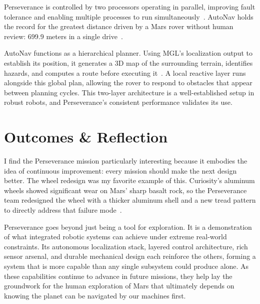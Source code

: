 \documentclass[11pt]{article}
\begin{document}
Perseverance is controlled by two processors operating in parallel, improving
fault tolerance and enabling multiple processes to run simultaneously~\cite{rover_components}. AutoNav holds the record
for the greatest distance driven by a Mars rover without human review: 699.9 meters in a single
drive~\cite{autonav_jpl,science_robotics}.

AutoNav functions as a hierarchical planner. Using MGL's localization output to establish its
position, it generates a 3D map of the surrounding terrain, identifies hazards, and computes a
route before executing it~\cite{autonav_jpl}. A local reactive layer runs alongside this global plan, allowing
the rover to respond to obstacles that appear between planning cycles. This two-layer architecture
is a well-established setup in robust robots, and Perseverance's consistent performance validates its use.

\section*{Outcomes \& Reflection}
I find the Perseverance mission particularly interesting because it embodies the idea of continuous
improvement: every mission should make the next design better. The wheel redesign was my favorite example of this.
Curiosity's aluminum wheels showed significant wear on Mars' sharp basalt rock,
so the Perseverance team redesigned the wheel with a thicker aluminum shell and a new tread pattern
to directly address that failure mode~\cite{rover_components}.

Perseverance goes beyond just being a tool for exploration. It is a demonstration of what integrated robotic
systems can achieve under extreme real-world constraints. Its autonomous localization stack, layered
control architecture, rich sensor arsenal, and durable mechanical design each reinforce the others,
forming a system that is more capable than any single subsystem could produce alone. As these
capabilities continue to advance in future missions, they help lay the groundwork for the human
exploration of Mars that ultimately depends on knowing the planet can be navigated by our machines first.

\newpage
\end{document}
